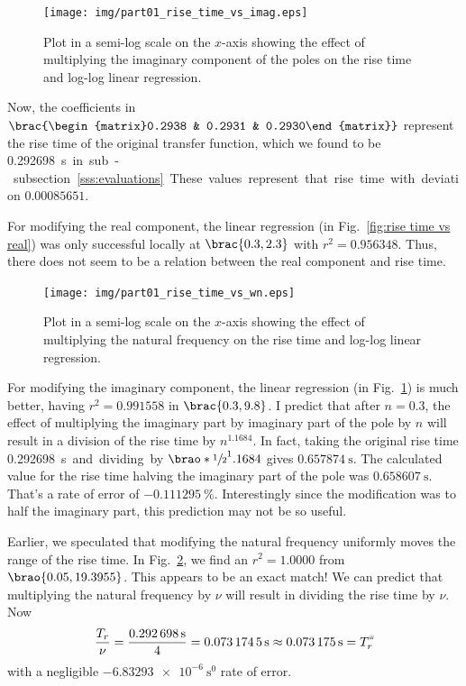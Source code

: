 \documentclass[12pt]{article}
\DeclarePairedDelimiter\brao()%
\DeclarePairedDelimiter\brac[]%
\newcommand{\setprime}[2][1]{%
    {#2}^{%
        \raisebox{1pt}{%
            \scalebox{0.5}{%
                \itshape\sffamily\uppercase%
                \expandafter{%
                    \romannumeral#1%
                }%
            }%
        }
    }%
}%
\begin{document}
\begin{figure}
    \centering
    \texttt{[image: img/part01\_rise\_time\_vs\_imag.eps]}
    \caption{Plot in a semi-log scale on the $x$-axis
    showing the effect of multiplying the imaginary component of the poles on the rise time and log-log linear regression.}
    \label{fig:rise time vs imag}
\end{figure}

Now, the coefficients in $\brac{\begin{matrix}0.2938 & 0.2931 & 0.2930\end{matrix}}$ represent the rise time of the original transfer function,
which we found to be \SI{0.292698}\second in sub-subsection~\ref{sss:evaluations}.
These values represent that rise time with deviation $\num{0.00085651}$.

For modifying the real component, the linear regression
(in Fig.~\ref{fig:rise time vs real})
was only successful locally at $\brac{0.3, 2.3}$ with $r^2 = \num{0.956348}$.
Thus, there does not seem to be a relation between the real component and rise time.

\begin{figure}
    \centering
    \texttt{[image: img/part01\_rise\_time\_vs\_wn.eps]}
    \caption{Plot in a semi-log scale on the $x$-axis
    showing the effect of multiplying the natural frequency on the rise time and log-log linear regression.}
    \label{fig:rise time vs wn}
\end{figure}

For modifying the imaginary component, the linear regression
(in Fig.~\ref{fig:rise time vs imag})
is much better, having $r^2 = 0.991558$ in $\brac{0.3, 9.8}$.
I predict that after $n = 0.3$, the effect of multiplying the imaginary part by imaginary part of the pole by $n$ will result in a division of the rise time by $n^{1.1684}$.
In fact, taking the original rise time \SI{0.292698}\second and dividing by $\brao*{\sfrac12}^1.1684$ gives $\SI{0.657874}\second$.
The calculated value for the rise time halving the imaginary part of the pole was $\SI{0.658607}\second$.
That's a rate of error of $\SI{-0.111295}\percent$.
Interestingly since the modification was to half the imaginary part, this prediction may not be so useful.

Earlier, we speculated that modifying the natural frequency uniformly moves the range of the rise time.
In Fig.~\ref{fig:rise time vs wn}, we find an $r^2 = 1.0000$ from $\brao{0.05, 19.3955}$.
This appears to be an exact match!
We can predict that multiplying the natural frequency by $\nu$ will result in dividing the rise time by $\nu$.
Now
\begin{equation}
    \frac{T_r}\nu = \frac{\SI{0.292698}\second}4 = \SI{0.0731745}\second \approx \SI{0.073175}\second = \setprime[3]{T}_r
\end{equation}
with a negligible $\SI{-6.83293e-6}{\second^0}$ rate of error.
\end{document}
